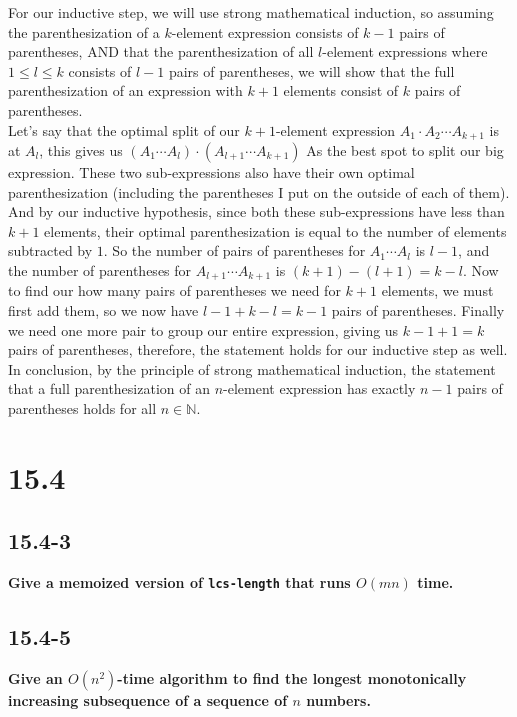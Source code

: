 \documentclass[11pt]{article}
\begin{document}
 For our inductive step, we will use strong mathematical induction, so assuming the 
 parenthesization of a $k$-element expression consists of  $k-1$ pairs of parentheses, AND that 
 the parenthesization of all $l$-element expressions where $1 \leq l \leq k$ consists of $l-1$ 
 pairs of parentheses, we will show that the full parenthesization of an expression with $k+1$ 
 elements consist of $k$ pairs of parentheses. \\ 

 Let's say that the optimal split of our $k+1$-element expression $A_1 \cdot A_2 \cdots A_{k+1}$ 
 is at $A_l$, this gives us $(A_1 \cdots A_l)\cdot(A_{l+1} \cdots A_{k+1})$ As the best spot to 
 split our big expression.  These two sub-expressions also have their own optimal parenthesization 
 (including the parentheses I put on the outside of each of them).  And by our inductive hypothesis, 
 since both these sub-expressions have less than $k+1$ elements, their optimal parenthesization is 
 equal to the number of elements subtracted by $1$.  So the number of pairs of parentheses for 
 $A_1 \cdots A_l$ is $l-1$, and the number of parentheses for $A_{l+1} \cdots A_{k+1}$ is 
 $(k+1)-(l+1) = k-l$.  Now to find our how many pairs of parentheses we need for $k+1$ elements, 
 we must first add them, so we now have $l-1+k-l=k-1$ pairs of parentheses.  Finally we need one 
 more pair to group our entire expression, giving us $k-1+1=k$ pairs of parentheses, therefore, 
 the statement holds for our inductive step as well. \\

 In conclusion, by the principle of strong mathematical induction, the statement that a full 
 parenthesization of an $n$-element expression has exactly $n-1$ pairs of parentheses holds 
 for all $n \in \mathbb{N}$.
 \newpage

 \section*{15.4}
 \subsection*{15.4-3}
 \textbf{Give a memoized version of \texttt{lcs-length} that runs $O(mn)$ time.}
 \newpage

 \subsection*{15.4-5}
 \textbf{Give an $O(n^2)$-time algorithm to find the longest monotonically increasing 
 subsequence of a sequence of $n$ numbers.}
 \newpage
\end{document}
